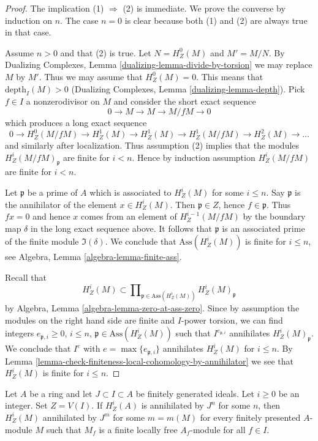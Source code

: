 \begin{proof}
The implication (1) $\Rightarrow$ (2) is immediate. We prove the converse
by induction on $n$. The case $n = 0$ is clear because both (1) and
(2) are always true in that case.

\medskip\noindent
Assume $n > 0$ and that (2) is true. Let $N = H^0_Z(M)$ and $M' = M/N$.
By Dualizing Complexes, Lemma \ref{dualizing-lemma-divide-by-torsion}
we may replace $M$ by $M'$.
Thus we may assume that $H^0_Z(M) = 0$.
This means that $\text{depth}_I(M) > 0$
(Dualizing Complexes, Lemma \ref{dualizing-lemma-depth}).
Pick $f \in I$ a nonzerodivisor on $M$ and consider the short
exact sequence
$$
0 \to M \to M \to M/fM \to 0
$$
which produces a long exact sequence
$$
0 \to H^0_Z(M/fM) \to H^1_Z(M) \to H^1_Z(M) \to H^1_Z(M/fM) \to
H^2_Z(M) \to \ldots
$$
and similarly after localization. Thus assumption (2) implies that
the modules $H^i_Z(M/fM)_\mathfrak p$ are finite for $i < n$. Hence
by induction assumption $H^i_Z(M/fM)$ are finite for $i < n$.

\medskip\noindent
Let $\mathfrak p$ be a prime of $A$ which is associated to
$H^i_Z(M)$ for some $i \leq n$. Say $\mathfrak p$ is the annihilator
of the element $x \in H^i_Z(M)$. Then $\mathfrak p \in Z$, hence
$f \in \mathfrak p$. Thus $fx = 0$ and hence $x$ comes from an
element of $H^{i - 1}_Z(M/fM)$ by the boundary map $\delta$ in the long
exact sequence above. It follows that $\mathfrak p$ is an associated
prime of the finite module $\Im(\delta)$. We conclude that
$\text{Ass}(H^i_Z(M))$ is finite for $i \leq n$, see
Algebra, Lemma \ref{algebra-lemma-finite-ass}.

\medskip\noindent
Recall that
$$
H^i_Z(M) \subset
\prod\nolimits_{\mathfrak p \in \text{Ass}(H^i_Z(M))}
H^i_Z(M)_\mathfrak p
$$
by Algebra, Lemma \ref{algebra-lemma-zero-at-ass-zero}. Since by
assumption the modules on the right hand side are finite and $I$-power
torsion, we can find integers $e_{\mathfrak p, i} \geq 0$, $i \leq n$,
$\mathfrak p \in \text{Ass}(H^i_Z(M))$ such that
$I^{e_{\mathfrak p, i}}$ annihilates $H^i_Z(M)_\mathfrak p$. We conclude
that $I^e$ with $e = \max\{e_{\mathfrak p, i}\}$ annihilates $H^i_Z(M)$
for $i \leq n$. By
Lemma \ref{lemma-check-finiteness-local-cohomology-by-annihilator}
we see that $H^i_Z(M)$ is finite for $i \leq n$.
\end{proof}

\begin{lemma}
\label{lemma-annihilate-local-cohomology}
Let $A$ be a ring and let $J \subset I \subset A$ be finitely generated ideals.
Let $i \geq 0$ be an integer. Set $Z = V(I)$. If
$H^i_Z(A)$ is annihilated by $J^n$ for some $n$, then
$H^i_Z(M)$ annihilated by $J^m$ for some $m = m(M)$
for every finitely presented $A$-module $M$ such that
$M_f$ is a finite locally free $A_f$-module for all $f \in I$.
\end{lemma}

